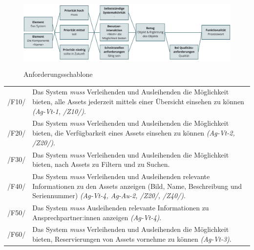 \begin{figure}[h]
        \centering
        \includegraphics[scale=0.45]{Bilder/anforderungsschablone.pdf}
        \label{fig:schablone}
        \caption[Anforderungsschablone]{Anforderungsschablone \cite{balzert2009}}
\end{figure}


\begin{center}
        \renewcommand{\arraystretch}{1.5}
        \begin{longtable}{lp{}} \arrayrulecolor{maincolor}\hline
                \sffamily\color{maincolor}/F10/  & Das System \textit{muss} Verleihenden und
                Ausleihenden die Möglichkeit bieten, alle Assets jederzeit mittels einer Übersicht
                einsehen zu können \textit{(Ag-Vt-1, /Z10/)}.                                           \\
                \sffamily\color{maincolor}/F20/  & Das System \textit{muss} Verleihenden und
                Ausleihenden die Möglichkeit bieten, die Verfügbarkeit eines Assets einsehen zu
                können \textit{(Ag-Vt-2, /Z20/)}.                                                       \\
                \sffamily\color{maincolor}/F30/  & Das System \textit{muss} Verleihenden und
                Ausleihenden die Möglichkeit bieten, nach Assets zu Filtern und zu Suchen.              \\
                \sffamily\color{maincolor}/F40/  & Das System \textit{muss}  Verleihenden und
                Ausleihenden relevante Informationen zu den Assets anzeigen (Bild, Name,
                Beschreibung und Seriennummer) \textit{(Ag-Vt-4, Ag-Au-2, /Z20/, /Z40/)}.               \\
                \sffamily\color{maincolor}/F50/  & Das System \textit{muss}  Ausleihenden relevante
                Informationen zu Ansprechpartner:innen anzeigen \textit{(Ag-Vt-4)}.                     \\
                \sffamily\color{maincolor}/F60/  & Das System \textit{muss} Verleihenden und
                Ausleihenden die Möglichkeit bieten, Reservierungen von Assets vornehme zu können \textit{(Ag-Vt-3)}.

\end{longtable}
\end{center}

